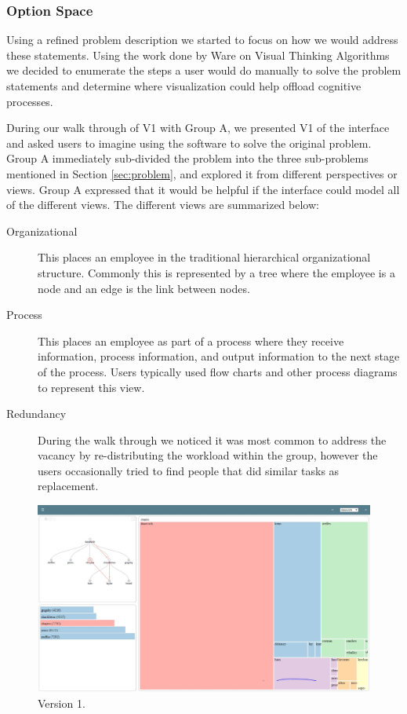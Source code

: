 \documentclass[journal]{vgtc}                %
\begin{document}
\subsubsection{Option Space}
Using a refined problem description we started to focus on how we would address these statements.  Using the work done by Ware on Visual Thinking Algorithms~\cite[Chapter 11]{ware2012information} we decided to enumerate the steps a user would do manually to solve the problem statements and determine where visualization could help offload cognitive processes.

During our walk through of V1 with Group A, we presented V1 of the interface and asked users to imagine using the software to solve the original problem. Group A immediately sub-divided the problem into the three sub-problems mentioned in Section \ref{sec:problem}, and explored it from different perspectives or views. Group A expressed that it would be helpful if the interface could model all of the different views. The different views are summarized below:

\begin{description}
\item [Organizational] This places an employee in the traditional hierarchical organizational structure.  Commonly this is represented by a tree where the employee is a node and an edge is the link between nodes.
\item [Process] This places an employee as part of a process where they receive information, process information, and output information to the next stage of the process.  Users typically used flow charts and other process diagrams to represent this view.
\item [Redundancy] During the walk through we noticed it was most common to address the vacancy by re-distributing the workload within the group, however the users occasionally tried to find people that did similar tasks as replacement.
\end{description}
\begin{figure}
  \centering
  \includegraphics[width=\columnwidth]{pictures/version1.JPG}
  \caption{Version 1. }
  \label{fig:version1}
\end{figure}
      
\end{document}
